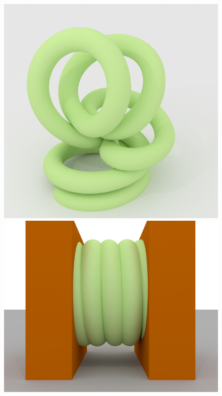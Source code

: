 \begin{figure}
{\includegraphics[height=.2\paperheight]{chapter_nonmanifoldlevelsets/images/coil_065.png}
\hfill
\includegraphics[height=.2\paperheight]{chapter_nonmanifoldlevelsets/images/compression_020.png}
}
\subfloat{
}
\end{figure}
